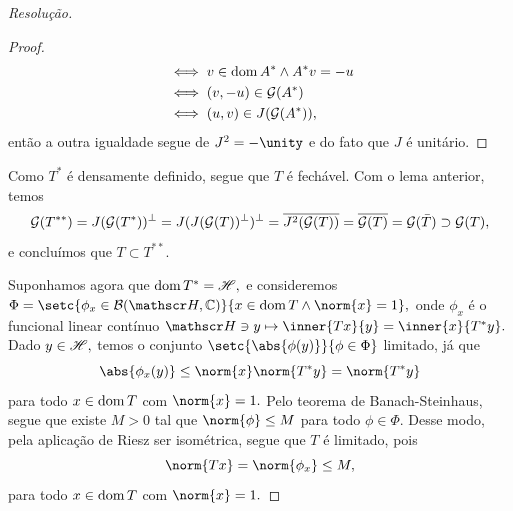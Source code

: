 \begin{proof}[Resolução]
\begin{proof}
\begin{align*}
                                 &\iff v \in \operatorname{dom}{A^*} \land A^*v = -u\\
                                 &\iff (v, -u) \in \mathcal{G}(A^*)\\
                                 &\iff (u,v) \in J(\mathcal{G}(A^*)),
    \end{align*}
    então a outra igualdade segue de \(J^2 = -\unity\) e do fato que \(J\) é unitário.
  \end{proof}
  Como \(T^*\) é densamente definido, segue que \(T\) é fechável. Com o lema anterior, temos
  \begin{equation*}
    \mathcal{G}(T^{**}) = J(\mathcal{G}(T^*))^\perp = J(J(\mathcal{G}(T))^\perp)^\perp = \overline{J^2(\mathcal{G}(T))} = \overline{\mathcal{G}(T)} = \mathcal{G}(\bar{T}) \supset \mathcal{G}(T),
  \end{equation*}
  e concluímos que \(T \subset T^{**}.\)

  Suponhamos agora que \(\operatorname{dom}{T^*} = \mathscr{H},\) e consideremos \(\Phi = \setc{\phi_x \in \bounded(\hilbert, \mathbb{C})}{x \in \dom{T} \land \norm{x} = 1},\) onde \(\phi_x\) é o funcional linear contínuo \(\hilbert \ni y \mapsto \inner{Tx}{y} = \inner{x}{T^*y}.\) Dado \(y \in \mathscr{H},\) temos o conjunto \(\setc{\abs{\phi(y)}}{\phi \in \Phi}\) limitado, já que
  \begin{equation*}
    \abs{\phi_x(y)} \leq \norm{x} \norm{T^*y} = \norm{T^*y}
  \end{equation*}
  para todo \(x \in \operatorname{dom}{T}\) com \(\norm{x} = 1.\) Pelo teorema de Banach-Steinhaus, segue que existe \(M > 0\) tal que \(\norm{\phi} \leq M\) para todo \(\phi \in \Phi.\) Desse modo, pela aplicação de Riesz ser isométrica, segue que \(T\) é limitado, pois
  \begin{equation*}
    \norm{Tx} = \norm{\phi_x} \leq M,
  \end{equation*}
  para todo \(x \in \operatorname{dom}{T}\) com \(\norm{x} = 1.\)
\end{proof}
